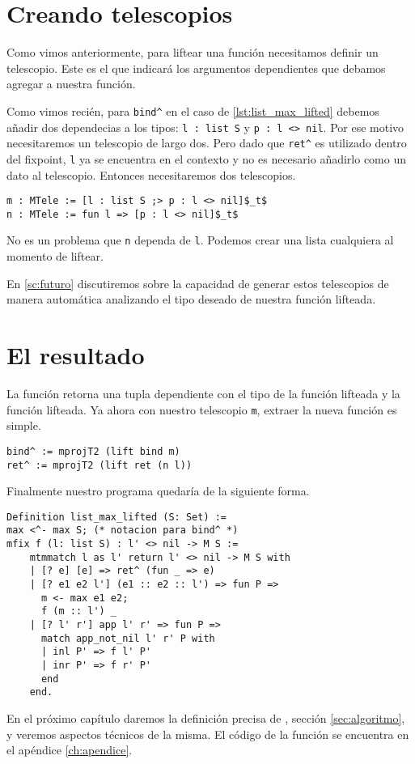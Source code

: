 \section{Creando telescopios}

Como vimos anteriormente, para liftear una función necesitamos definir un telescopio. Este es el que indicará los argumentos dependientes que debamos agregar a nuestra función.

Como vimos recién, para \lstinline{bind^} en el caso de \ref{lst:list_max_lifted} debemos añadir dos dependecias a los tipos: \lstinline{l : list S} y \lstinline{p : l <> nil}.
Por ese motivo necesitaremos un telescopio de largo dos.
Pero dado que \lstinline{ret^} es utilizado dentro del fixpoint, \lstinline{l} ya se encuentra en el contexto y no es necesario añadirlo como un dato al telescopio. Entonces necesitaremos dos telescopios.

\begin{lstlisting}[frame=tb,caption={Telescopio para \lstinline{list_max}},label=lst:list_max_tele]
m : MTele := [l : list S ;> p : l <> nil]$_t$
n : MTele := fun l => [p : l <> nil]$_t$
\end{lstlisting}

No es un problema que \lstinline{n} dependa de \lstinline{l}. Podemos crear una lista cualquiera al momento de liftear.

En \ref{sc:futuro} discutiremos sobre la capacidad de generar estos telescopios de manera automática analizando el tipo deseado de nuestra función lifteada.

\section{El resultado}

La función \lift retorna una tupla dependiente con el tipo de la función lifteada y la función lifteada. Ya ahora con nuestro telescopio \lstinline{m}, extraer la nueva función es simple.

\begin{lstlisting}[float=h,frame=tb,caption={Lifteando \lstinline{ret} y \lstinline{bind}}]
bind^ := mprojT2 (lift bind m)
ret^ := mprojT2 (lift ret (n l))
\end{lstlisting}

Finalmente nuestro programa quedaría de la siguiente forma.

\begin{lstlisting}[float=h,frame=tb,caption={Lifteando \lstinline{ret} y \lstinline{bind}}]
Definition list_max_lifted (S: Set) :=
max <^- max S; (* notacion para bind^ *)
mfix f (l: list S) : l' <> nil -> M S :=
    mtmmatch l as l' return l' <> nil -> M S with
    | [? e] [e] => ret^ (fun _ => e)
    | [? e1 e2 l'] (e1 :: e2 :: l') => fun P =>
      m <- max e1 e2;
      f (m :: l') _
    | [? l' r'] app l' r' => fun P =>
      match app_not_nil l' r' P with
      | inl P' => f l' P'
      | inr P' => f r' P'
      end
    end.
\end{lstlisting}

En el próximo capítulo daremos la definición precisa de \lift, sección \ref{sec:algoritmo}, y veremos aspectos técnicos de la misma.
El código de la función se encuentra en el apéndice \ref{ch:apendice}.

